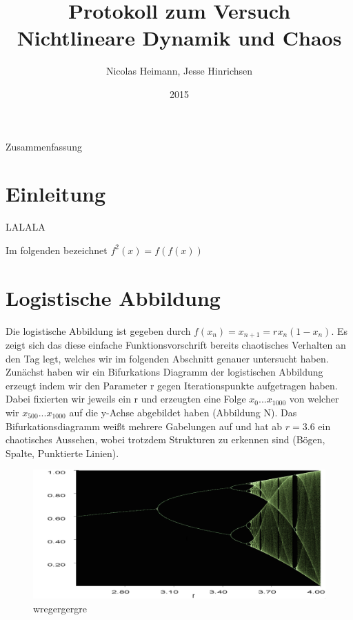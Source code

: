 \documentclass{scrartcl}
\title{Protokoll zum Versuch Nichtlineare Dynamik und Chaos}
\author{Nicolas Heimann, Jesse Hinrichsen}
\affil{\textit{Universität Hamburg}}
\date{2015}
\begin{document}
\maketitle




\begin{description}
\item Zusammenfassung
\end{description}


\section{  Einleitung  }
LALALA

Im folgenden bezeichnet $f^2(x) = f(f(x))$

\section{Logistische Abbildung}
Die logistische Abbildung ist gegeben durch $f(x_n)=x_{n+1}=rx_n(1-x_n)$. Es zeigt sich das diese einfache Funktionsvorschrift 
bereits chaotisches Verhalten an den Tag legt, welches wir im folgenden Abschnitt genauer untersucht haben. Zunächst haben 
wir ein Bifurkations Diagramm der logistischen Abbildung erzeugt indem wir den Parameter r gegen Iterationspunkte aufgetragen haben. Dabei fixierten wir jeweils ein r und erzeugten eine Folge $x_0 ... x_{1000}$ von welcher wir $x_{500} ... x_{1000}$ auf die y-Achse abgebildet haben (Abbildung N). Das Bifurkationsdiagramm weißt mehrere Gabelungen auf und hat ab $r=3.6$ ein chaotisches Aussehen, wobei trotzdem Strukturen zu erkennen sind (Bögen, Spalte, Punktierte Linien).
\begin{figure}
	\centering
	\includegraphics[scale=0.35]{bifurkation}
	\caption{wregergergre}
	\label{bifurkation}
\end{figure}
\end{document}

